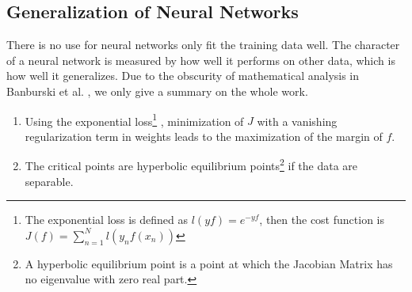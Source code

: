 \subsection{Generalization of Neural Networks}
There is no use for neural networks only fit the training data 
well. The character of a neural network is measured by how well
it performs on other data, which is how well it generalizes.
Due to the obscurity of mathematical analysis in Banburski et al.
\parencite{banburski2019theory}, we only give a summary on 
the whole work.
\begin{enumerate}
    \item Using the exponential loss\footnote{The exponential loss
    is defined as $ l(y f)=e^{-y f} $, then the cost function is 
    $J(f)=\sum_{n=1}^{N} l\left(y_{n} f\left(x_{n}\right)\right)$} 
    , minimization of $ J $ with a vanishing regularization term in
    weights leads to the maximization of the margin of $f$.
    \item The critical points are hyperbolic equilibrium points\footnote{
    A hyperbolic equilibrium point is a point at which the Jacobian Matrix
    has no eigenvalue with zero real part.\parencite{hyperbolic}} if the 
    data are separable.
    
\end{enumerate}

